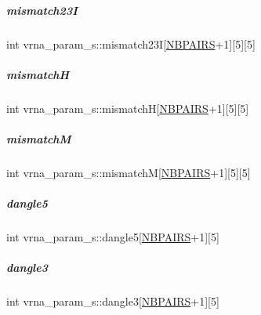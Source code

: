 \mbox{\label{group__energy__parameters_a2d8a2ed8936cd60fbed953a2bc64f9b3}} 
\subparagraph{\texorpdfstring{mismatch23I}{mismatch23I}}
{\footnotesize\ttfamily int vrna\+\_\+param\+\_\+s\+::mismatch23I\mbox{[}\mbox{\hyperlink{energy__const_8h_a5e75221c779d618eab81e096f37e32ce}{N\+B\+P\+A\+I\+RS}}+1\mbox{]}\mbox{[}5\mbox{]}\mbox{[}5\mbox{]}}

\mbox{\label{group__energy__parameters_ad07794648fa1cac6f02c57c095fb53e6}} 
\subparagraph{\texorpdfstring{mismatchH}{mismatchH}}
{\footnotesize\ttfamily int vrna\+\_\+param\+\_\+s\+::mismatchH\mbox{[}\mbox{\hyperlink{energy__const_8h_a5e75221c779d618eab81e096f37e32ce}{N\+B\+P\+A\+I\+RS}}+1\mbox{]}\mbox{[}5\mbox{]}\mbox{[}5\mbox{]}}

\mbox{\label{group__energy__parameters_afcc32f63f2c829bfb0016db82f7810fc}} 
\subparagraph{\texorpdfstring{mismatchM}{mismatchM}}
{\footnotesize\ttfamily int vrna\+\_\+param\+\_\+s\+::mismatchM\mbox{[}\mbox{\hyperlink{energy__const_8h_a5e75221c779d618eab81e096f37e32ce}{N\+B\+P\+A\+I\+RS}}+1\mbox{]}\mbox{[}5\mbox{]}\mbox{[}5\mbox{]}}

\mbox{\label{group__energy__parameters_ad2534b54836d48b4f549b319766f658f}} 
\subparagraph{\texorpdfstring{dangle5}{dangle5}}
{\footnotesize\ttfamily int vrna\+\_\+param\+\_\+s\+::dangle5\mbox{[}\mbox{\hyperlink{energy__const_8h_a5e75221c779d618eab81e096f37e32ce}{N\+B\+P\+A\+I\+RS}}+1\mbox{]}\mbox{[}5\mbox{]}}

\mbox{\label{group__energy__parameters_a75c644da73d4d01c86b5f6a1e3af3ae9}} 
\subparagraph{\texorpdfstring{dangle3}{dangle3}}
{\footnotesize\ttfamily int vrna\+\_\+param\+\_\+s\+::dangle3\mbox{[}\mbox{\hyperlink{energy__const_8h_a5e75221c779d618eab81e096f37e32ce}{N\+B\+P\+A\+I\+RS}}+1\mbox{]}\mbox{[}5\mbox{]}}

